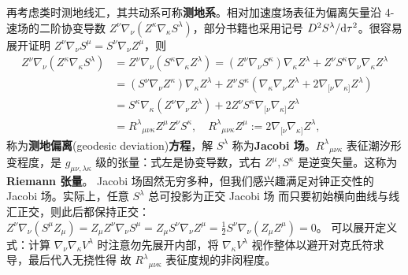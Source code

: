 再考虑类时测地线汇，其共动系可称\textbf{测地系}。相对加速度场表征为偏离矢量沿 4-速场的二阶协变导数 $Z^\nu \nabla_\nu(Z^\kappa \nabla_\kappa S^\lambda)$，部分书籍也采用记号 ${D^2S^\lambda}/{\dd\tau^2}$。很容易展开证明 $Z^\nu\nabla_\nu S^\mu=S^\nu\nabla_\nu Z^\mu$，则
\begin{align}
    Z^\nu \nabla_\nu(Z^\kappa \nabla_\kappa S^\lambda)&= Z^\nu \nabla_\nu\left(S^\kappa\nabla_\kappa Z^\lambda\right) = \left(Z^\nu \nabla_\nu S^\kappa\right)\nabla_\kappa Z^\lambda+Z^\nu S^\kappa \nabla_\nu \nabla_\kappa Z^\lambda\nonumber\\
    &= \left(S^\nu \nabla_\nu Z^\kappa\right)\nabla_\kappa Z^\lambda+Z^\nu S^\kappa\left(\nabla_\kappa \nabla_\nu Z^\lambda+2\nabla_{[\nu}\nabla_{\kappa]}Z^\lambda\right)\nonumber\\
    &=S^\kappa\nabla_\kappa\left(Z^\nu \nabla_\nu Z^\lambda\right) +2Z^\nu S^\kappa\nabla_{[\nu}\nabla_{\kappa]}Z^\lambda\nonumber\\
    &=R^\lambda{}_{\mu\nu\kappa}  Z^\mu  Z^\nu S^\kappa,\quad R^\lambda{}_{\mu\nu\kappa}Z^\mu:= 2\nabla_{[\nu}\nabla_{\kappa]}Z^\lambda,
\end{align}
称为\textbf{测地偏离}(geodesic deviation)\textbf{方程}，解 $S^\lambda$ 称为\textbf{Jacobi 场}。$R^\lambda{}_{\mu\nu\kappa}$ 表征潮汐形变程度，是 $g_{\mu\nu,\lambda\kappa}$ 级的张量：式左是协变导数，式右 $Z^\mu,S^\kappa$ 是逆变矢量。这称为\textbf{Riemann 张量}。
Jacobi 场固然无穷多种，但我们感兴趣满足对钟正交性的 Jacobi 场。实际上，任意 $S^\lambda$ 总可投影为正交 Jacobi 场
而只要初始横向曲线与线汇正交，则此后都保持正交：$Z^\nu \nabla_\nu\left(S^\mu Z_\mu\right) =Z_\mu Z^\nu \nabla_\nu S^\mu=Z_\mu S^\nu \nabla_\nu Z^\mu=\frac{1}{2} S^\nu \nabla_\nu\left(Z_\mu Z^\mu\right)=0$。
可以展开定义式：计算 $\nabla_\nu\nabla_\kappa V^\lambda$ 时注意勿先展开内部，将 $\nabla_\kappa V^\lambda$ 视作整体以避开对克氏符求导，最后代入无挠性得
故 $R^\lambda{}_{\mu\nu\kappa}$ 表征度规的非闵程度。

